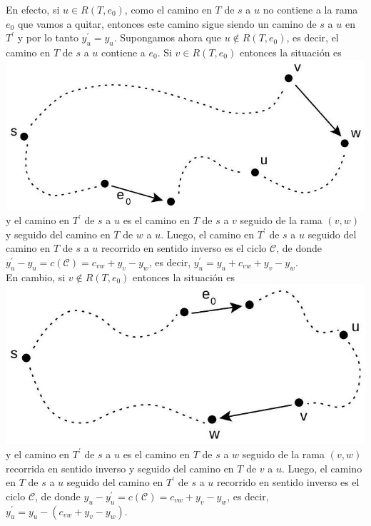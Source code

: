 \documentclass[10pt]{article}
\begin{document}
En efecto, si $u \in R\left(T, e_{0}\right)$, como el camino en $T$ de $s$ a $u$ no contiene a la rama $e_{0}$ que vamos a quitar, entonces este camino sigue siendo un camino de $s$ a $u$ en $T^{\prime}$ y por lo tanto $y_{u}^{\prime}=y_{u}$. Supongamos ahora que $u \notin R\left(T, e_{0}\right)$, es decir, el camino en $T$ de $s$ a $u$ contiene a $e_{0}$. Si $v \in R\left(T, e_{0}\right)$ entonces la situación es\\
\includegraphics[max width=\textwidth, center]{2025_09_05_955b52bfc43174a24a9ag-24(2)}\\
y el camino en $T^{\prime}$ de $s$ a $u$ es el camino en $T$ de $s$ a $v$ seguido de la rama $(v, w)$ y seguido del camino en $T$ de $w$ a $u$. Luego, el camino en $T^{\prime}$ de $s$ a $u$ seguido del camino en $T$ de $s$ a $u$ recorrido en sentido inverso es el ciclo $\mathcal{C}$, de donde $y_{u}^{\prime}-y_{u}=c(\mathcal{C})=c_{v w}+y_{v}-y_{w}$, es decir, $y_{u}^{\prime}=y_{u}+c_{v w}+y_{v}-y_{w}$.\\
En cambio, si $v \notin R\left(T, e_{0}\right)$ entonces la situación es\\
\includegraphics[max width=\textwidth, center]{2025_09_05_955b52bfc43174a24a9ag-24(1)}\\
y el camino en $T^{\prime}$ de $s$ a $u$ es el camino en $T$ de $s$ a $w$ seguido de la rama $(v, w)$ recorrida en sentido inverso y seguido del camino en $T$ de $v$ a $u$. Luego, el camino en $T$ de $s$ a $u$ seguido del camino en $T^{\prime}$ de $s$ a $u$ recorrido en sentido inverso es el ciclo $\mathcal{C}$, de donde $y_{u}-y_{u}^{\prime}=c(\mathcal{C})=c_{v w}+y_{v}-y_{w}$, es decir, $y_{u}^{\prime}=y_{u}-\left(c_{v w}+y_{v}-y_{w}\right)$.
\end{document}
